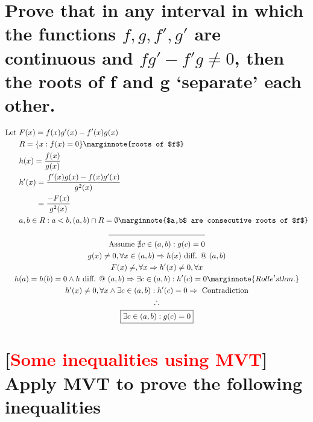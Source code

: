 \documentclass[letterpaper]{article}
\begin{document}
\section{Prove that in any interval in which the functions $f,g,f',g'$ are continuous and $fg'-f'g\neq0$, then the roots of f and g `separate' each other.}
\begin{gather*}
	\begin{aligned}
		\text{Let } &F(x)=f(x)g'(x)-f'(x)g(x) \\
		&R=\{x:f(x)=0\} \marginnote{roots of $f$} \\
		&h(x)=\frac{f(x)}{g(x)} \\
		&\begin{aligned}
			h'(x)&=\frac{f'(x)g(x)-f(x)g'(x)}{g^2(x)} \\
			&=\frac{-F(x)}{g^2(x)} \\
		\end{aligned} \\
		&a,b\in R:a<b,(a,b)\cap R=\emptyset \marginnote{$a,b$ are consecutive roots of $f$}
	\end{aligned} \\
	\line(1, 0){125} \\
	\text{Assume }\nexists c\in(a,b):g(c)=0 \\
	g(x)\neq0, \forall x\in(a,b) \Rightarrow h(x) \text{ diff. @ }(a,b) \\
	F(x)\neq,\forall x\Rightarrow h'(x)\neq0,\forall x \\
	h(a)=h(b)=0\land h\text{ diff. @ }(a,b)\Rightarrow\exists c\in(a,b):h'(c)=0 \marginnote{Rolle's thm.} \\
	h'(x)\neq0,\forall x \land \exists c\in(a,b):h'(c)=0\Rightarrow\text{ Contradiction} \\
	\therefore \\
	\boxed{\exists c\in(a,b):g(c)=0}
\end{gather*}

\section{[\textcolor{red}{Some inequalities using MVT}] Apply MVT to prove the following inequalities}
\end{document}
